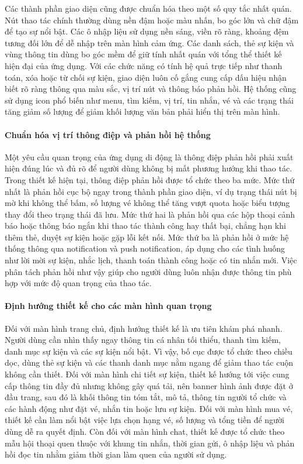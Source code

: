 \documentclass[../DoAn.tex]{subfiles}
\begin{document}
Các thành phần giao diện cũng được chuẩn hóa theo một số quy tắc nhất quán. Nút thao tác chính thường dùng nền đậm hoặc màu nhấn, bo góc lớn và chữ đậm để tạo sự nổi bật. Các ô nhập liệu sử dụng nền sáng, viền rõ ràng, khoảng đệm tương đối lớn để dễ nhập trên màn hình cảm ứng. Các danh sách, thẻ sự kiện và vùng thông tin dùng bo góc mềm để giữ tính nhất quán với tổng thể thiết kế hiện đại của ứng dụng. Với các chức năng có tính hệ quả trực tiếp như thanh toán, xóa hoặc từ chối sự kiện, giao diện luôn cố gắng cung cấp dấu hiệu nhận biết rõ ràng thông qua màu sắc, vị trí nút và thông báo phản hồi. Hệ thống cũng sử dụng icon phổ biến như menu, tìm kiếm, vị trí, tin nhắn, vé và các trạng thái tăng giảm số lượng để giảm khối lượng văn bản phải hiển thị trên màn hình.

\paragraph{Chuẩn hóa vị trí thông điệp và phản hồi hệ thống}\mbox{}

Một yêu cầu quan trọng của ứng dụng di động là thông điệp phản hồi phải xuất hiện đúng lúc và đủ rõ để người dùng không bị mất phương hướng khi thao tác. Trong thiết kế hiện tại, thông điệp phản hồi được tổ chức theo ba mức. Mức thứ nhất là phản hồi cục bộ ngay trong thành phần giao diện, ví dụ trạng thái nút bị mờ khi không thể bấm, số lượng vé không thể tăng vượt quota hoặc biểu tượng thay đổi theo trạng thái đã lưu. Mức thứ hai là phản hồi qua các hộp thoại cảnh báo hoặc thông báo ngắn khi thao tác thành công hay thất bại, chẳng hạn khi thêm thẻ, duyệt sự kiện hoặc gặp lỗi kết nối. Mức thứ ba là phản hồi ở mức hệ thống thông qua notification và push notification, áp dụng cho các tình huống như lời mời sự kiện, nhắc lịch, thanh toán thành công hoặc có tin nhắn mới. Việc phân tách phản hồi như vậy giúp cho người dùng luôn nhận được thông tin phù hợp với mức độ quan trọng của thao tác.

\paragraph{Định hướng thiết kế cho các màn hình quan trọng}\mbox{}

Đối với màn hình trang chủ, định hướng thiết kế là ưu tiên khám phá nhanh. Người dùng cần nhìn thấy ngay thông tin cá nhân tối thiểu, thanh tìm kiếm, danh mục sự kiện và các sự kiện nổi bật. Vì vậy, bố cục được tổ chức theo chiều dọc, dùng thẻ sự kiện và các thanh danh mục nằm ngang để giảm thao tác cuộn không cần thiết. Đối với màn hình chi tiết sự kiện, thiết kế hướng tới việc cung cấp thông tin đầy đủ nhưng không gây quá tải, nên banner hình ảnh được đặt ở đầu trang, sau đó là khối thông tin tóm tắt, mô tả, thông tin người tổ chức và các hành động như đặt vé, nhắn tin hoặc lưu sự kiện. Đối với màn hình mua vé, thiết kế cần làm nổi bật việc lựa chọn hạng vé, số lượng và tổng tiền để người dùng dễ ra quyết định. Còn đối với màn hình chat, thiết kế được tổ chức theo mẫu hội thoại quen thuộc với khung tin nhắn, thời gian gửi, ô nhập liệu và phản hồi đọc tin nhằm giảm thời gian làm quen của người sử dụng.
\end{document}
